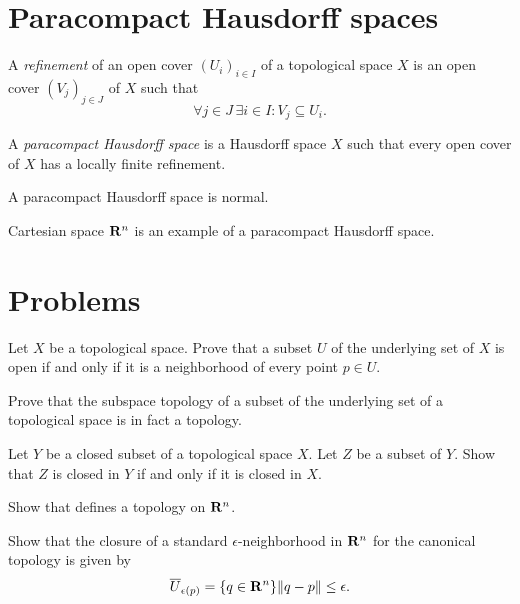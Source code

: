 \section{Paracompact Hausdorff spaces}
\label{sec:paracompactness}

A \emph{refinement} of an open cover $(U_i)_{i \in I}$ of a topological space $X$
is an open cover $(V_j)_{j \in J}$ of $X$ such that
\[
  \forall j \in J \, \exists i \in I: V_j \subseteq U_i.
\]

\begin{dfn}
  A \emph{paracompact Hausdorff space} is a Hausdorff space $X$ such that every
  open cover of $X$ has a locally finite refinement.
\end{dfn}

\begin{prop}
  \label{prop:paracompact_spaces}
  A paracompact Hausdorff space is normal.
\end{prop}

Cartesian space $\mathbf{R}^n$ is an example of a paracompact Hausdorff space.

\section{Problems}

\begin{xca}
  Let $X$ be a topological space. Prove that a subset $U$ of the underlying set
  of $X$ is open if and only if it is a neighborhood of every point $p \in U$.
\end{xca}

\begin{xca}
  Prove that the subspace topology of a subset of the underlying set of a topological
  space is in fact a topology.
\end{xca}

\begin{xca}
  Let $Y$ be a closed subset of a topological space $X$. Let $Z$ be a subset of
  $Y$. Show that $Z$ is closed in $Y$ if and only if it is closed in $X$.
\end{xca}

\begin{xca}
  Show that  defines a topology on $\mathbf{R}^n$.
\end{xca}

\begin{xca}
  Show that the closure of a standard $\epsilon$-neighborhood in $\mathbf{R}^n$
  for the canonical topology is given by
  \begin{equation}
    \overline U_{\epsilon(p)} = \lbrace q \in \mathbf{R}^n\rbrace{\lVert q - p\rVert \leq \epsilon}.
  \end{equation}
\end{xca}

